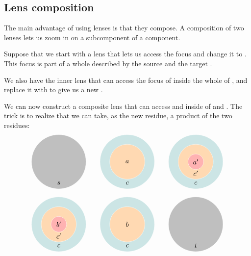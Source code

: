 \documentclass[DaoFP]{subfiles}
\begin{document}
\subsection{Lens composition}

The main advantage of using lenses is that they compose. A composition of two lenses lets us zoom in on a subcomponent of a component. 

Suppose that we start with a lens that lets us access the focus   and change it to . This focus is part of a whole described by the source  and the target . 

We also have the inner lens that can access the focus of   inside the whole of , and replace it with  to give us a new . 

We can now construct a composite lens that can access  and  inside of  and . The trick is to realize that we can take, as the new residue, a product of the two residues:
\[
\begin{tikzpicture}
\filldraw[fill=gray!50, draw=white] (0, 0) circle (1.4);
\node at (0, -1.1) {$s$};
\end{tikzpicture}
\hspace{20pt}
\begin{tikzpicture}
\filldraw[fill=blue!50!green!20, draw=white] (0, 0) circle (1.4);
\filldraw[fill=orange!30, draw=white] (0, 0) circle (0.9);
\node at (0, 0) {$a$};
\node at (0, -1.1) {$c$};
\end{tikzpicture}
\hspace{20pt}
\begin{tikzpicture}
\filldraw[fill=blue!50!green!20, draw=white] (0, 0) circle (1.4);
\filldraw[fill=orange!30, draw=white] (0, 0) circle (0.9);
\filldraw[fill=red!30, draw=white] (0, 0) circle (0.4);
\node at (0, 0) {$a'$};
\node at (0, -0.6) {$c'$};
\node at (0, -1.1) {$c$};
\end{tikzpicture}
\]

\[
\begin{tikzpicture}
\filldraw[fill=blue!50!green!20, draw=white] (0, 0) circle (1.4);
\filldraw[fill=orange!30, draw=white] (0, 0) circle (0.9);
\filldraw[fill=red!30, draw=white] (0, 0) circle (0.4);
\node at (0, 0) {$b'$};
\node at (0, -0.6) {$c'$};
\node at (0, -1.1) {$c$};
\end{tikzpicture}
\hspace{20pt}
\begin{tikzpicture}
\filldraw[fill=blue!50!green!20, draw=white] (0, 0) circle (1.4);
\filldraw[fill=orange!30, draw=white] (0, 0) circle (0.9);
\node at (0, 0) {$b$};
\node at (0, -1.1) {$c$};
\end{tikzpicture}
\hspace{20pt}
\begin{tikzpicture}
\filldraw[fill=gray!50, draw=white] (0, 0) circle (1.4);
\node at (0, -1.1) {$t$};
\end{tikzpicture}
\]
\end{document}
